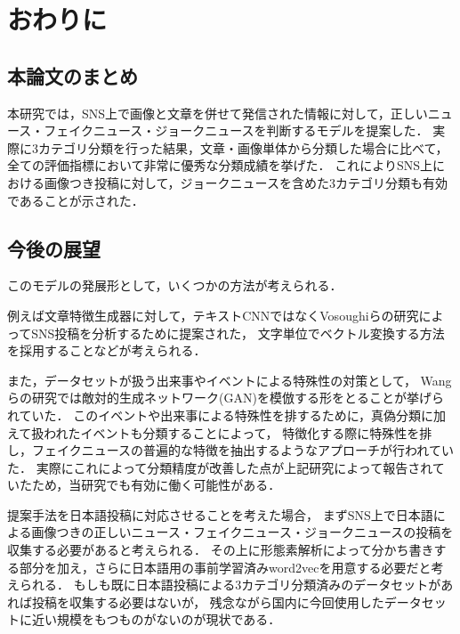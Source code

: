 %
\chapter{おわりに}
%
\section{本論文のまとめ}
本研究では，SNS上で画像と文章を併せて発信された情報に対して，正しいニュース・フェイクニュース・ジョークニュースを判断するモデルを提案した．
実際に3カテゴリ分類を行った結果，文章・画像単体から分類した場合に比べて，全ての評価指標において非常に優秀な分類成績を挙げた．
これによりSNS上における画像つき投稿に対して，ジョークニュースを含めた3カテゴリ分類も有効であることが示された．
%
\section{今後の展望}
このモデルの発展形として，いくつかの方法が考えられる．

例えば文章特徴生成器に対して，テキストCNNではなくVosoughiらの研究\cite{Vosoughi:2016:TLT:2911451.2914762}によってSNS投稿を分析するために提案された，
文字単位でベクトル変換する方法を採用することなどが考えられる．

また，データセットが扱う出来事やイベントによる特殊性の対策として，
Wangらの研究\cite{Wang:2018:EEA:3219819.3219903}では敵対的生成ネットワーク(GAN)を模倣する形をとることが挙げられていた．
このイベントや出来事による特殊性を排するために，真偽分類に加えて扱われたイベントも分類することによって，
特徴化する際に特殊性を排し，フェイクニュースの普遍的な特徴を抽出するようなアプローチが行われていた．
実際にこれによって分類精度が改善した点が上記研究によって報告されていたため，当研究でも有効に働く可能性がある．

提案手法を日本語投稿に対応させることを考えた場合，
まずSNS上で日本語による画像つきの正しいニュース・フェイクニュース・ジョークニュースの投稿を収集する必要があると考えられる．
その上に形態素解析によって分かち書きする部分を加え，さらに日本語用の事前学習済みword2vecを用意する必要だと考えられる．
もしも既に日本語投稿による3カテゴリ分類済みのデータセットがあれば投稿を収集する必要はないが，
残念ながら国内に今回使用したデータセットに近い規模をもつものがないのが現状である．

% 